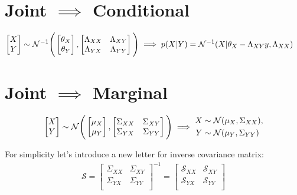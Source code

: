 \section{Joint $\implies$ Conditional}
\begin{align}
	\begin{aligned}
		\begin{bmatrix}
			X \\ Y
		\end{bmatrix}
		\sim \mathcal{N}^{-1} \Bigg(
		\begin{bmatrix}
			\theta_X \\ \theta_Y
		\end{bmatrix},
		\begin{bmatrix}
			\Lambda_{XX} & 	\Lambda_{XY} \\
			\Lambda_{YX} & 	\Lambda_{YY} \\
		\end{bmatrix}
		\Bigg)
	\end{aligned}
	\implies
	\begin{aligned}
		p(X|Y) &= \mathcal{N}^{-1}(X| \theta_X - \Lambda_{XY} y, \Lambda_{XX})
	\end{aligned}
\end{align}



\section{Joint $\implies$ Marginal}
\begin{align}
	\begin{aligned}
		\begin{bmatrix}
			X \\ Y
		\end{bmatrix}
		\sim \mathcal{N} \Bigg(
		\begin{bmatrix}
			\mu_X \\ \mu_Y
		\end{bmatrix},
		\begin{bmatrix}
			\Sigma_{XX} & 	\Sigma_{XY} \\
			\Sigma_{YX} & 	\Sigma_{YY} \\
		\end{bmatrix}
		\Bigg)
	\end{aligned}
\implies
	\begin{aligned}
		X &\sim \mathcal{N}(\mu_X, \Sigma_{XX}), \\ 
		Y &\sim \mathcal{N}(\mu_Y, \Sigma_{YY})
	\end{aligned}
\end{align}

For simplicity let's introduce a new letter for inverse covariance matrix:
\begin{align}
	\mathcal{S} = \begin{bmatrix}
		\Sigma_{XX} & 	\Sigma_{XY} \\
		\Sigma_{YX} & 	\Sigma_{YY} \\
	\end{bmatrix} ^ {-1} 
= \begin{bmatrix}
	\mathcal{S}_{XX} & 	\mathcal{S}_{XY} \\
	\mathcal{S}_{YX} & 	\mathcal{S}_{YY} \\
\end{bmatrix}
\end{align}